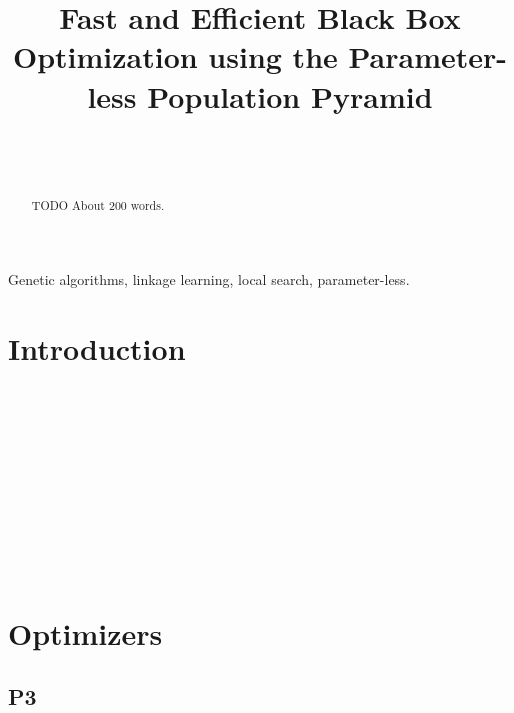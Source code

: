 \documentclass[twoside]{article}
\begin{document}
\title{\bf Fast and Efficient Black Box Optimization using the Parameter-less Population Pyramid}  

\author{ \hfill {}\\ 
\AND
        \hfill {}\\
}

\maketitle

\begin{abstract}

TODO About 200 words.

\end{abstract}

\begin{keywords}

Genetic algorithms, 
linkage learning,
local search,
parameter-less.

\end{keywords}

\section{Introduction}
~\cite{Wolpert:1997:nfl}

~\cite{goldberg:1991:gasize} %

~\cite{grefenstette:1986:optimalga} %

~\cite{harik:1999:parameterlessga}

~\cite{posik:2011:parameterless} %

~\cite{goldman:2014:p3}

\section{Optimizers}

\subsection{P3}
~\cite{goldman:2014:p3}
\end{document}
